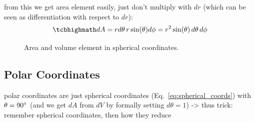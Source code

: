 \documentclass[../class_mech_main.tex]{subfiles}
\begin{document}
from this we get area element easily, just don't multiply with $dr$ (which can be seen as differentiation with respect to $dr$):
\begin{equation}
    \eqbox{
        dA = r d\theta \, r \sin(\theta) d\phi = r^2 \sin(\theta) \, d\theta \, d\phi
    }
\end{equation}



\begin{figure}
    \centering

    \hspace*{0.08\textwidth}%

    \caption{Area and volume element in spherical coordinates.}
    \label{fig:spherical_coords_are_vol_el}
\end{figure}



        \subsection{Polar Coordinates}


polar coordinates are just spherical coordinates (Eq.~\eqref{eq:spherical_coords}) with $\theta = 90\degree$ (and we get $dA$ from $dV$ by formally setting $d\theta = 1$) -> thus trick: remember spherical coordinates, then how they reduce
\end{document}
